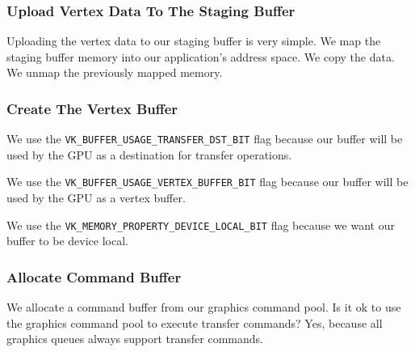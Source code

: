 \subsubsection{Upload Vertex Data To The Staging Buffer}

Uploading the vertex data to our staging buffer is very simple.
We map the staging buffer memory into our application's address space.
We copy the data.
We unmap the previously mapped memory.

\begin{minipage}{\linewidth}{\noindent}
    
\end{minipage}

\subsubsection{Create The Vertex Buffer}

We use the \texttt{VK\_BUFFER\_USAGE\_TRANSFER\_DST\_BIT} flag
because our buffer will be used by the GPU as a destination for
transfer operations.

We use the \texttt{VK\_BUFFER\_USAGE\_VERTEX\_BUFFER\_BIT} flag
because our buffer will be used by the GPU as a vertex buffer.

We use the \texttt{VK\_MEMORY\_PROPERTY\_DEVICE\_LOCAL\_BIT} flag
because we want our buffer to be device local.

\begin{minipage}{\linewidth}{\noindent}
    
\end{minipage}

\subsubsection{Allocate Command Buffer}

We allocate a command buffer from our graphics command pool.
Is it ok to use the graphics command pool to execute transfer commands?
Yes, because all graphics queues always support transfer commands.

\begin{minipage}{\linewidth}{\noindent}
    
\end{minipage}

